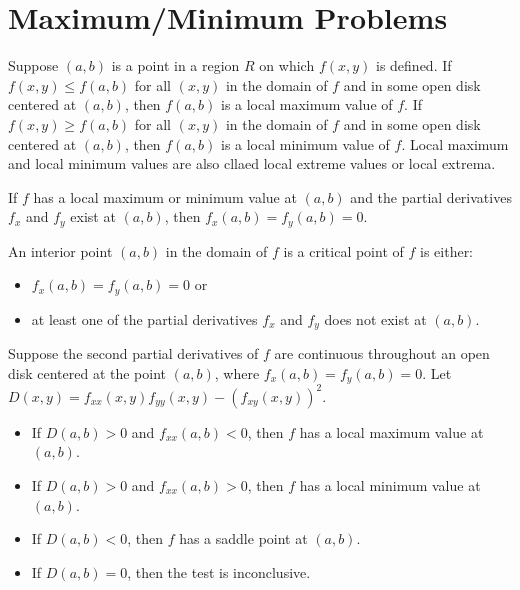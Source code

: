 \documentclass[../calc3.tex]{subfiles}
\begin{document}
\section{Maximum/Minimum Problems}
\begin{definition}
    Suppose $(a,b)$ is a point in a region $R$ on which $f(x,y)$ is defined. If
    $f(x,y) \leq f(a,b)$ for all $(x,y)$ in the domain of $f$ and in some open disk centered 
    at $(a,b)$, then $f(a,b)$ is a local maximum value of $f$. If $f(x,y)\geq f(a,b)$ for all 
    $(x,y)$ in the domain of $f$ and in some open disk centered at $(a,b)$, then $f(a,b)$ is 
    a local minimum value of $f$. Local maximum and local minimum values are also cllaed local extreme values 
    or local extrema.
\end{definition}

\begin{theorem}
    If $f$ has a local maximum or minimum value at $(a,b)$ and the partial derivatives $f_x$ 
    and $f_y$ exist at $(a,b)$, then $f_x(a,b) = f_y(a,b)=0$.
\end{theorem}

\begin{definition}
    An interior point $(a,b)$ in the domain of $f$ is a critical point of $f$ is either:
    \begin{itemize}
        \item $f_x(a,b)=f_y(a,b)=0$ or 
        \item at least one of the partial derivatives $f_x$ and $f_y$ does not exist at $(a,b)$.
    \end{itemize}
\end{definition}

\begin{theorem}
    Suppose the second partial derivatives of $f$ are continuous throughout an 
    open disk centered at the point $(a,b)$, where $f_x(a,b) = f_y(a,b) =0$. Let 
    $D(x,y)=f_{xx}(x,y)f_{yy}(x,y)-(f_{xy}(x,y))^2$.

    \begin{itemize}
        \item If $D(a,b)>0$ and $f_{xx}(a,b)<0$, then $f$ has a local maximum value at $(a,b)$.
        \item If $D(a,b)>0$ and $f_{xx}(a,b)>0$, then $f$ has a local minimum value at $(a,b)$.
        \item If $D(a,b)<0$, then $f$ has a saddle point at $(a,b)$.
        \item If $D(a,b)=0$, then the test is inconclusive.
    \end{itemize}
\end{theorem}
\end{document}
